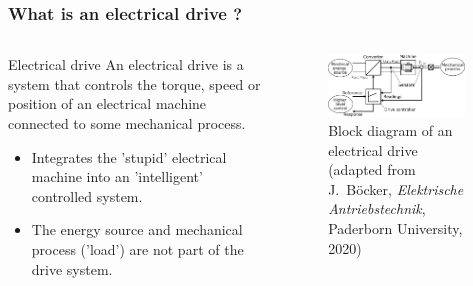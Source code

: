 \begin{frame}
	\frametitle{What is an electrical drive ?}
	\begin{columns}
		\begin{column}{0.4\textwidth}
			\begin{varblock}{Electrical drive}
			   An electrical drive is a system that controls the torque, speed or position of an electrical machine connected to some mechanical process.
			\end{varblock}
			\vspace{0.25cm}
			\begin{itemize}
				\item Integrates the 'stupid' electrical machine into an 'intelligent' controlled system.
				\item The energy source and mechanical process ('load') are not part of the drive system.
			\end{itemize}
		\end{column}
		\begin{column}{0.6\textwidth}
			\begin{figure}
				\centering
				\includegraphics[width=0.95\textwidth]{fig/lec01/Electrical_Drive_Block_Overview.pdf}
				\caption{Block diagram of an electrical drive (adapted from J.~B\"ocker, \textit{Elektrische Antriebstechnik}, Paderborn University, 2020)}
			\end{figure}
		\end{column}
	\end{columns}
\end{frame}

